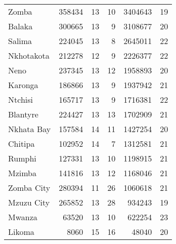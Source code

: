 \begin{tabular}{lrrrrr}
Zomba         &      358434 &          13 &           10 &          3404643 &          19 \\
Balaka        &      300665 &          13 &            9 &          3108677 &          20 \\
Salima        &      224045 &          13 &            8 &          2645011 &          22 \\
Nkhotakota    &      212278 &          12 &            9 &          2226377 &          22 \\
Neno          &      237345 &          13 &           12 &          1958893 &          20 \\
Karonga       &      186866 &          13 &            9 &          1937942 &          21 \\
Ntchisi       &      165717 &          13 &            9 &          1716381 &          22 \\
Blantyre      &      224427 &          13 &           13 &          1702909 &          21 \\
Nkhata Bay    &      157584 &          14 &           11 &          1427254 &          20 \\
Chitipa       &      102952 &          14 &            7 &          1312581 &          21 \\
Rumphi        &      127331 &          13 &           10 &          1198915 &          21 \\
Mzimba        &      141816 &          13 &           12 &          1168046 &          21 \\
Zomba City    &      280394 &          11 &           26 &          1060618 &          21 \\
Mzuzu City    &      265852 &          13 &           28 &           934243 &          19 \\
Mwanza        &       63520 &          13 &           10 &           622254 &          23 \\
Likoma        &        8060 &          15 &           16 &            48040 &          20 \\
\bottomrule
\end{tabular}
